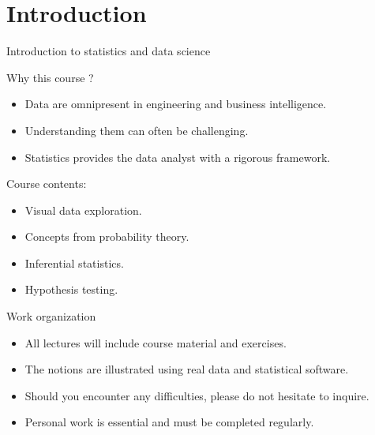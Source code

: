 \documentclass[main.tex]{subfiles}
\begin{document}
\section{Introduction}



\begin{frame}[fragile]{Introduction to statistics and data science}
\begin{block}{Why this course ?}
\begin{itemize}
    \item<+-> Data are omnipresent in engineering and business intelligence.
    \item<+-> Understanding them can often be challenging.
    \item<+-> Statistics provides the data analyst with a rigorous framework.
\end{itemize}
\end{block}
\begin{block}{Course contents:}
\begin{itemize}
    \item<+-> Visual data exploration.
    \item<+-> Concepts from probability theory.
    \item<+-> Inferential statistics.
    \item<+-> Hypothesis testing.
\end{itemize}
\end{block}
\end{frame}

\begin{frame}[fragile]{Work organization}
\begin{itemize}
    \item<+-> All lectures will include course material and exercises.
    \item<+-> The notions are illustrated using real data and statistical software.
    \item<+->Should you encounter any difficulties, please do not hesitate to inquire.
    \item<+->Personal work is essential and must be completed regularly.
\end{itemize}
\end{frame}
\end{document}
